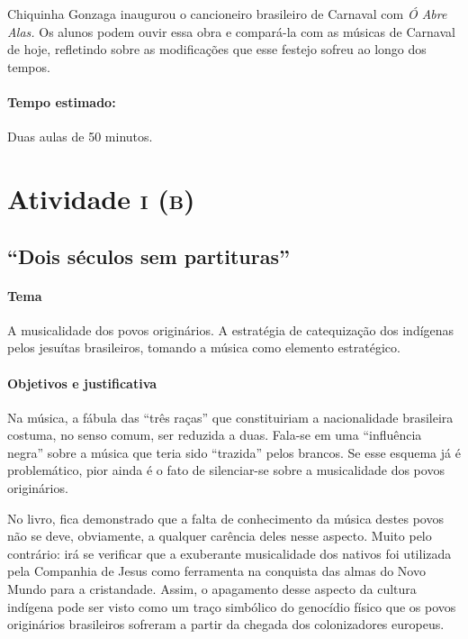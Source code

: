 \documentclass[11pt]{extarticle}
\begin{document}
Chiquinha Gonzaga inaugurou o cancioneiro brasileiro de Carnaval com
\emph{Ó Abre Alas.} Os alunos podem ouvir essa obra e compará-la com as
músicas de Carnaval de hoje, refletindo sobre as modificações que esse
festejo sofreu ao longo dos tempos.

\paragraph{Tempo estimado:} Duas aulas de 50 minutos.



\section{Atividade \textsc{i (b)}}
\subsection{“Dois séculos sem partituras”}

\paragraph{Tema} A musicalidade dos povos originários. A estratégia de catequização dos
indígenas pelos jesuítas brasileiros, tomando a música como elemento
estratégico.  


\paragraph{Objetivos e justificativa}

Na música, a fábula das “três raças” que constituiriam a nacionalidade
brasileira costuma, no senso comum, ser reduzida a duas. Fala-se em uma
“influência negra” sobre a música que teria sido “trazida” pelos brancos. Se
esse esquema já é problemático, pior ainda é o fato de silenciar-se sobre a
musicalidade dos povos originários.

No livro, fica demonstrado que a falta de conhecimento da música destes povos
não se deve, obviamente, a qualquer carência deles nesse aspecto. Muito pelo
contrário: irá se verificar que a exuberante musicalidade dos nativos foi
utilizada pela Companhia de Jesus como ferramenta na conquista das almas do
Novo Mundo para a cristandade. Assim, o apagamento desse aspecto da cultura
indígena pode ser visto como um traço simbólico do genocídio físico que os
povos originários brasileiros sofreram a partir da chegada dos colonizadores
europeus. 
\end{document}
